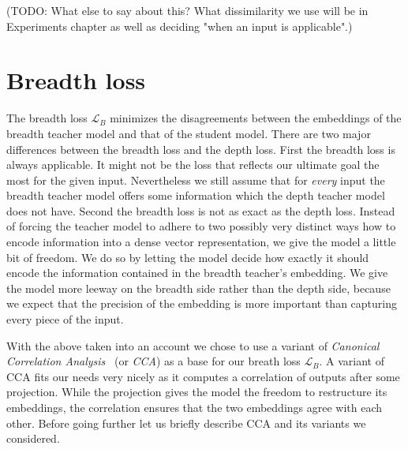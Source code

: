 (TODO: What else to say about this? What dissimilarity we use will be in
Experiments chapter as well as deciding "when an input is applicable".)


\section{Breadth loss}


The breadth loss $\mathcal{L}_B$ minimizes the disagreements between the
embeddings of the breadth teacher model {\Mb} and that of the student model.
There are two major differences between the breadth loss and the depth loss.
First the breadth loss is always applicable. It might not be the loss that
reflects our ultimate goal the most for the given input. Nevertheless we still
assume that for \emph{every} input the breadth teacher model offers some
information which the depth teacher model does not have. Second the breadth loss
is not as exact as the depth loss. Instead of forcing the teacher model to
adhere to two possibly very distinct ways how to encode information into a dense
vector representation, we give the model a little bit of freedom. We do so by
letting the model decide how exactly it should encode the information contained
in the breadth teacher's embedding. We give the model more leeway on the breadth
side rather than the depth side, because we expect that the precision of the
embedding is more important than capturing every piece of the input.

With the above taken into an account we chose to use a variant of
\emph{Canonical Correlation Analysis}~\cite{hotelling1992relations} (or
\emph{CCA}) as a base for our breath loss $\mathcal{L}_B$. A variant of CCA fits
our needs very nicely as it computes a correlation of outputs after some
projection. While the projection gives the model the freedom to restructure its
embeddings, the correlation ensures that the two embeddings agree with each
other. Before going further let us briefly describe CCA and its variants we
considered.

